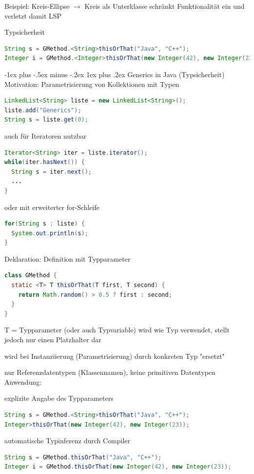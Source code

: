 \documentclass[10pt]{article}
\makeatletter
\renewcommand{\subsubsection}{\@startsection{subsubsection}{3}{0mm}%
                                {-1ex plus -.5ex minus -.2ex}%
                                {1ex plus .2ex}%
                                {\normalfont\small\bfseries}}
\makeatother
\begin{document}
Beispiel: Kreis-Ellipse $\rightarrow$ Kreis als Unterklasse schränkt Funktionalität ein und verletzt damit LSP

Typsicherheit
\begin{lstlisting}[language=java]
String s = GMethod.<String>thisOrThat("Java", "C++");
Integer i = GMethod.<Integer>thisOrThat(new Integer(42), new Integer(23));
\end{lstlisting}

\subsubsection{Generics in Java (Typsicherheit)}
Motivation: Parametrisierung von Kollektionen mit Typen
\begin{lstlisting}[language=java]
LinkedList<String> liste = new LinkedList<String>();
liste.add("Generics");
String s = liste.get(0);
\end{lstlisting}

auch für Iteratoren nutzbar
\begin{lstlisting}[language=java]
Iterator<String> iter = liste.iterator();
while(iter.hasNext()) {
  String s = iter.next();
  ...
}
\end{lstlisting}

oder mit erweiterter for-Schleife
\begin{lstlisting}[language=java]
for(String s : liste) {
  System.out.println(s);
}
\end{lstlisting}

Deklaration: Definition mit Typparameter
\begin{lstlisting}[language=java]
class GMethod {
  static <T> T thisOrThat(T first, T second) {
    return Math.random() > 0.5 ? first : second;
  }
}
\end{lstlisting}

\begin{itemize*}
  \item T = Typparameter (oder auch Typvariable) wird wie Typ verwendet, stellt jedoch nur einen Platzhalter dar
  \item wird bei Instanziierung (Parametrisierung) durch konkreten Typ "ersetzt"
  \item nur Referenzdatentypen (Klassennamen), keine primitiven Datentypen
  Anwendung:
  \item explizite Angabe des Typparameters
  \begin{lstlisting}[language=java]
String s = GMethod.<String>thisOrThat("Java", "C++");
Integer>thisOrThat(new Integer(42), new Integer(23));
  \end{lstlisting}
  \item automatische Typinferenz durch Compiler
  \begin{lstlisting}[language=java]
String s = GMethod.thisOrThat("Java", "C++");
Integer i = GMethod.thisOrThat(new Integer(42), new Integer(23));
  \end{lstlisting}
\end{itemize*}
\end{document}
